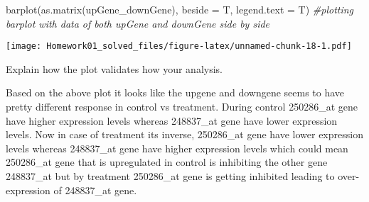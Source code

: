 \documentclass[
]{article}
\newenvironment{Shaded}{\begin{snugshade}}{\end{snugshade}}
\newcommand{\AttributeTok}[1]{\textcolor[rgb]{0.77,0.63,0.00}{#1}}
\newcommand{\CommentTok}[1]{\textcolor[rgb]{0.56,0.35,0.01}{\textit{#1}}}
\newcommand{\FunctionTok}[1]{\textcolor[rgb]{0.00,0.00,0.00}{#1}}
\newcommand{\NormalTok}[1]{#1}
\begin{document}
\begin{Shaded}
\begin{Highlighting}[]
\FunctionTok{barplot}\NormalTok{(}\FunctionTok{as.matrix}\NormalTok{(upGene\_downGene), }\AttributeTok{beside =}\NormalTok{ T, }\AttributeTok{legend.text =}\NormalTok{ T) }\CommentTok{\#plotting barplot with data of both upGene and downGene side by side}
\end{Highlighting}
\end{Shaded}

\texttt{[image: Homework01\_solved\_files/figure-latex/unnamed-chunk-18-1.pdf]}

Explain how the plot validates how your analysis.

Based on the above plot it looks like the upgene and downgene seems to
have pretty different response in control vs treatment. During control
250286\_at gene have higher expression levels whereas 248837\_at gene
have lower expression levels. Now in case of treatment its inverse,
250286\_at gene have lower expression levels whereas 248837\_at gene
have higher expression levels which could mean 250286\_at gene that is
upregulated in control is inhibiting the other gene 248837\_at but by
treatment 250286\_at gene is getting inhibited leading to
over-expression of 248837\_at gene.
\end{document}
